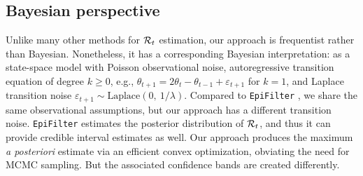 

\subsection{Bayesian perspective}

Unlike many other methods for $\mathcal{R}_t$ estimation, our approach is frequentist
rather than Bayesian. Nonetheless, it has a corresponding Bayesian
interpretation: as a state-space model with Poisson observational noise,
autoregressive transition equation of degree $k\geq 0$, e.g., $\theta_{t+1} =
2\theta_t - \theta_{t-1} + \varepsilon_{t+1}$ for $k=1$, and Laplace transition
noise $\varepsilon_{t+1}\sim \mathrm{Laplace}(0,\ 1/\lambda)$. Compared to
\texttt{EpiFilter} \citep{parag2021improved},
 we share the same observational assumptions, but our approach has a
different transition noise. \texttt{EpiFilter} estimates the posterior
distribution of
$\mathcal{R}_t$, and thus it can provide credible interval estimates as well. Our
approach produces the maximum \emph{a posteriori} estimate via an efficient
convex optimization, obviating the need for MCMC sampling. But the associated
confidence bands are created differently.
